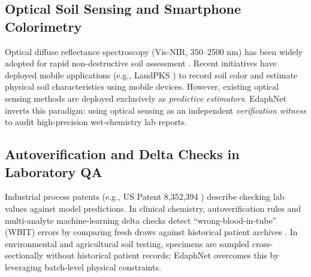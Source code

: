 \documentclass[journal,twoside]{IEEEtran}
\begin{document}
\subsection{Optical Soil Sensing and Smartphone Colorimetry}
Optical diffuse reflectance spectroscopy (Vis-NIR, 350--2500 nm) has been widely adopted for rapid non-destructive soil assessment \cite{viscarra2016global, safanelli2025ossl}. Recent initiatives have deployed mobile applications (e.g., LandPKS \cite{herrick2013landpks}) to record soil color and estimate physical soil characteristics using mobile devices. However, existing optical sensing methods are deployed exclusively as \emph{predictive estimators}. EdaphNet inverts this paradigm: using optical sensing as an independent \emph{verification witness} to audit high-precision wet-chemistry lab reports.

\subsection{Autoverification and Delta Checks in Laboratory QA}
Industrial process patents (e.g., US Patent 8,352,394 \cite{stephenson2013patent}) describe checking lab values against model predictions. In clinical chemistry, autoverification rules and multi-analyte machine-learning delta checks detect ``wrong-blood-in-tube'' (WBIT) errors by comparing fresh draws against historical patient archives \cite{westgard2020laboratory, rosenbaum2018machine}. In environmental and agricultural soil testing, specimens are sampled cross-sectionally without historical patient records; EdaphNet overcomes this by leveraging batch-level physical constraints.
\end{document}

